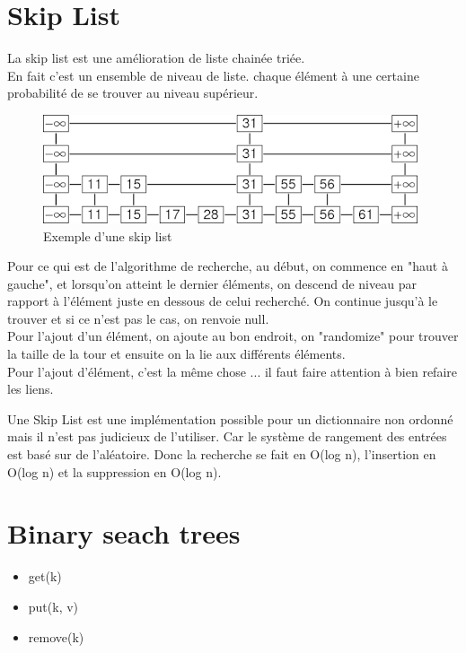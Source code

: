 \documentclass[a4paper]{article}
\begin{document}
\section{Skip List}
La skip list est une amélioration de liste chainée triée. \\
En fait c'est un ensemble de niveau de liste. chaque élément à une certaine probabilité de se trouver au niveau supérieur.

\begin{figure}[!h]
\begin{center}
\includegraphics[scale=0.4]{skip-list.png}
\caption{Exemple d'une skip list}
\end{center}
\end{figure}

Pour ce qui est de l'algorithme de recherche, au début, on commence en "haut à gauche", et lorsqu'on atteint le dernier éléments, on descend de niveau par rapport à l'élément juste en dessous de celui recherché.
On continue jusqu'à le trouver et si ce n'est pas le cas, on renvoie null.\\
Pour l'ajout d'un élément, on ajoute au bon endroit, on "randomize" pour trouver la taille de la tour et ensuite on la lie aux différents éléments.\\
Pour l'ajout d'élément, c'est la même chose ... il faut faire attention à bien refaire les liens.

Une Skip List est une implémentation possible pour un dictionnaire non ordonné mais il n'est pas judicieux de l'utiliser. Car le système de rangement des entrées est basé sur de l'aléatoire. Donc la recherche se fait en O(log n), l'insertion en O(log n) et la suppression en O(log n).

\section{Binary seach trees}
\begin{itemize}
\item get(k)
\item put(k, v)
\item remove(k)
\end{itemize}
\end{document}
